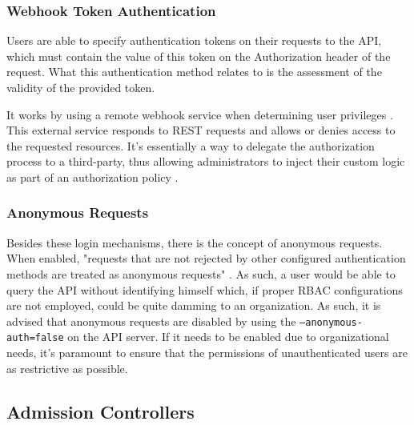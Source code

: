 \documentclass[a4paper,11pt,openright,BCOR=15mm]{scrbook}
\begin{document}
\subsubsection{Webhook Token Authentication}

Users are able to specify authentication tokens on their requests to the API, which must contain the value of this token on the Authorization header of the request. What this authentication method relates to is the assessment of the validity of the provided token.

It works by using a remote webhook service when determining user privileges \cite{the_linux_foundation_webhook_2024}. This external service responds to REST requests and allows or denies access to the requested resources. It's essentially a way to delegate the authorization process to a third-party, thus allowing administrators to inject their custom logic as part of an authorization policy \cite{eknert_kubernetes_2022}.

\subsubsection{Anonymous Requests}

Besides these login mechanisms, there is the concept of anonymous requests. When enabled, "requests that are not rejected by other configured authentication methods are treated as anonymous requests" \cite{the_linux_foundation_authenticating_2024}. As such, a user would be able to query the API without identifying himself which, if proper RBAC configurations are not employed, could be quite damming to an organization. As such, it is advised that anonymous requests are disabled by using the \texttt{--anonymous-auth=false} on the API server. If it needs to be enabled due to organizational needs, it's paramount to ensure that the permissions of unauthenticated users are as restrictive as possible.

\subsection{Admission Controllers}
\end{document}
